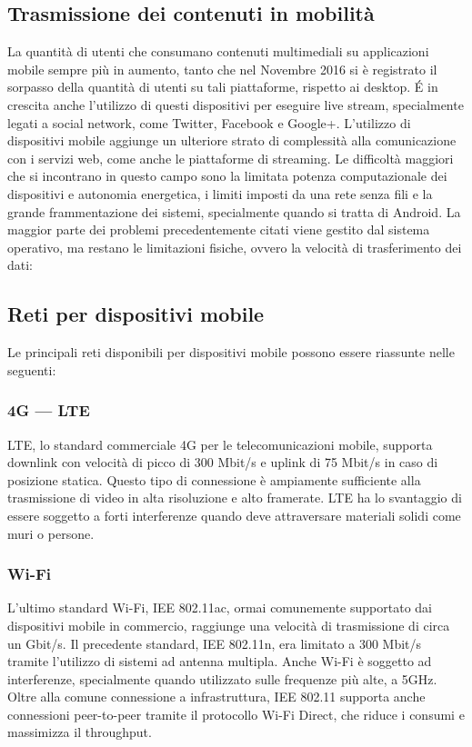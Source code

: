 	\subsection{Trasmissione dei contenuti in mobilità}
			La quantità di utenti che consumano contenuti multimediali su applicazioni mobile sempre più in aumento, tanto che nel Novembre 2016 si è registrato il sorpasso della quantità di utenti su tali piattaforme, rispetto ai desktop. É in crescita anche l'utilizzo di questi dispositivi per eseguire live stream, specialmente legati a social network, come Twitter, Facebook e Google+.
			L'utilizzo di dispositivi mobile aggiunge un ulteriore strato di complessità alla comunicazione con i servizi web, come anche le piattaforme di streaming.
			Le difficoltà maggiori che si incontrano in questo campo sono la limitata potenza computazionale dei dispositivi e autonomia energetica, i limiti imposti da una rete senza fili e la grande frammentazione dei sistemi, specialmente quando si tratta di Android.
			La maggior parte dei problemi precedentemente citati viene gestito dal sistema operativo, ma restano le limitazioni fisiche, ovvero la velocità di trasferimento dei dati:
	\subsection{Reti per dispositivi mobile}
			Le principali reti disponibili per dispositivi mobile possono essere riassunte nelle seguenti:
		\subsubsection{4G --- LTE}
			LTE, lo standard commerciale 4G per le telecomunicazioni mobile, supporta downlink con velocità di picco di 300 Mbit/s e uplink di 75 Mbit/s in caso di posizione statica. Questo tipo di connessione è ampiamente sufficiente alla trasmissione di video in alta risoluzione e alto framerate. LTE ha lo svantaggio di essere soggetto a forti interferenze quando deve attraversare materiali solidi come muri o persone.
		\subsubsection{Wi-Fi}
			L'ultimo standard Wi-Fi, IEE 802.11ac, ormai comunemente supportato dai dispositivi mobile in commercio, raggiunge una velocità di trasmissione di circa un Gbit/s. Il precedente standard, IEE 802.11n, era limitato a 300 Mbit/s tramite l'utilizzo di sistemi ad antenna multipla. Anche Wi-Fi è soggetto ad interferenze, specialmente quando utilizzato sulle frequenze più alte, a 5GHz. Oltre alla comune connessione a infrastruttura, IEE 802.11 supporta anche connessioni peer-to-peer tramite il protocollo Wi-Fi Direct, che riduce i consumi e massimizza il throughput.
